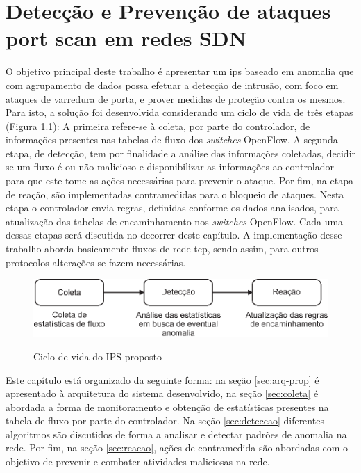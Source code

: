 \chapter{Detecção e Prevenção de ataques port scan em redes SDN}
\label{cap:metodologia}

O objetivo principal deste trabalho é apresentar um \gls{ips} baseado em anomalia que com agrupamento de dados possa efetuar a detecção de intrusão, com foco em ataques de varredura de porta, e prover medidas de proteção contra os mesmos. Para isto, a solução foi desenvolvida considerando um ciclo de vida de três etapas (Figura \ref{fig:lifecicle}): A primeira refere-se à coleta, por parte do controlador, de informações presentes nas tabelas de fluxo dos \textit{switches} OpenFlow. A segunda etapa, de detecção, tem por finalidade a análise das informações coletadas, decidir se um fluxo é ou não malicioso e disponibilizar as informações ao controlador para que este tome as ações necessárias para prevenir o ataque. Por fim, na etapa de reação, são implementadas contramedidas para o bloqueio de ataques. Nesta etapa o controlador envia regras, definidas conforme os dados analisados, para atualização das tabelas de encaminhamento nos \textit{switches} OpenFlow. Cada uma dessas etapas será discutida no decorrer deste capítulo. A implementação desse trabalho aborda basicamente fluxos de rede \gls{tcp}, sendo assim, para outros protocolos alterações se fazem necessárias.

\begin{figure}[H]
  \centering
  \caption{Ciclo de vida do IPS proposto}
  \includegraphics[width=.650\textwidth]{images/lifecicle.eps}
  \label{fig:lifecicle}
\end{figure}

Este capítulo está organizado da seguinte forma: na seção \ref{sec:arq-prop} é apresentado à arquitetura do sistema desenvolvido, na seção \ref{sec:coleta} é abordada a forma de monitoramento e obtenção de estatísticas presentes na tabela de fluxo por parte do controlador. Na seção \ref{sec:deteccao} diferentes algoritmos são discutidos de forma a analisar e detectar padrões de anomalia na rede. Por fim, na seção \ref{sec:reacao}, ações de contramedida são abordadas com o objetivo de prevenir e combater atividades maliciosas na rede.

